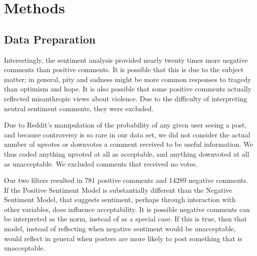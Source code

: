 \section{Methods}
\subsection{Data Preparation}
Interestingly, the sentiment analysis provided nearly twenty times more negative comments than positive comments. It is possible that this is due to the subject matter; in general, pity and sadness might be more common responses to tragedy than optimism and hope. It is also possible that some positive comments actually reflected misanthropic views about violence. Due to the difficulty of interpreting neutral sentiment comments, they were excluded.

Due to Reddit's manipulation of the probability of any given user seeing a post, and because controversy is so rare in our data set, we did not consider the actual number of upvotes or downvotes a comment received to be useful information. We thus coded anything upvoted at all as acceptable, and anything downvoted at all as unacceptable. We excluded comments that received no votes.

Our two filters resulted in 781 positive comments and 14289 negative comments. If the Positive Sentiment Model is substantially different than the Negative Sentiment Model, that suggests sentiment, perhaps through interaction with other variables, does influence acceptability. It is possible negative comments can be interpreted as the norm, instead of as a special case. If this is true, then that model, instead of reflecting when negative sentiment would be unacceptable, would reflect in general when posters are more likely to post something that is unacceptable. 

